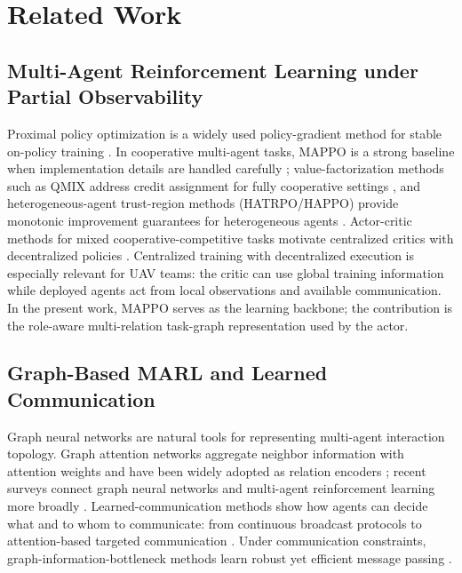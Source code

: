 \section{Related Work}

\subsection{Multi-Agent Reinforcement Learning under Partial Observability}

Proximal policy optimization is a widely used policy-gradient method for stable on-policy training \cite{schulman2017ppo}. In cooperative multi-agent tasks, MAPPO is a strong baseline when implementation details are handled carefully \cite{yu2022mappo}; value-factorization methods such as QMIX address credit assignment for fully cooperative settings \cite{rashid2018qmix}, and heterogeneous-agent trust-region methods (HATRPO/HAPPO) provide monotonic improvement guarantees for heterogeneous agents \cite{kuba2022happo}. Actor-critic methods for mixed cooperative-competitive tasks motivate centralized critics with decentralized policies \cite{lowe2017maddpg}. Centralized training with decentralized execution is especially relevant for UAV teams: the critic can use global training information while deployed agents act from local observations and available communication. In the present work, MAPPO serves as the learning backbone; the contribution is the role-aware multi-relation task-graph representation used by the actor.

\subsection{Graph-Based MARL and Learned Communication}

Graph neural networks are natural tools for representing multi-agent interaction topology. Graph attention networks aggregate neighbor information with attention weights and have been widely adopted as relation encoders \cite{velickovic2018gat}; recent surveys connect graph neural networks and multi-agent reinforcement learning more broadly \cite{liu2024gnn_marl}. Learned-communication methods show how agents can decide what and to whom to communicate: from continuous broadcast protocols \cite{sukhbaatar2016commnet} to attention-based targeted communication \cite{jiang2018i2c, das2019tarmac}. Under communication constraints, graph-information-bottleneck methods learn robust yet efficient message passing \cite{ding2024magi}.

